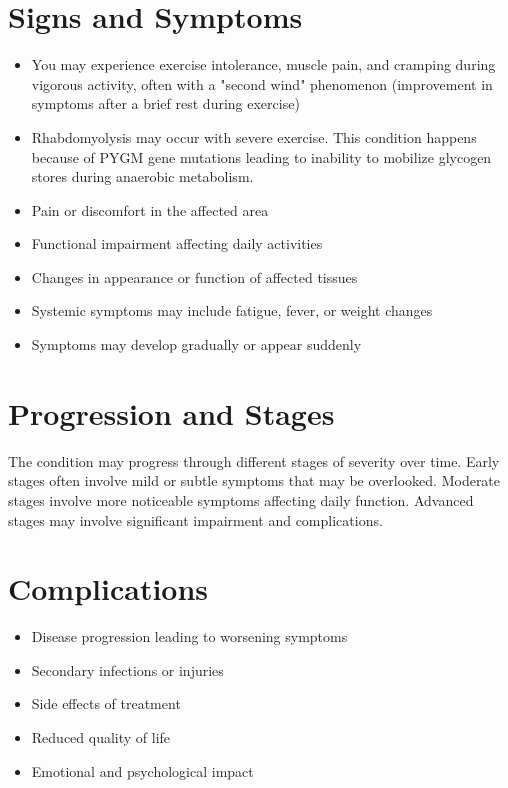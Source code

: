 \section{Signs and Symptoms}
\begin{itemize}[noitemsep]
  \item You may experience exercise intolerance, muscle pain, and cramping during vigorous activity, often with a "second wind" phenomenon (improvement in symptoms after a brief rest during exercise)
  \item Rhabdomyolysis may occur with severe exercise. This condition happens because of PYGM gene mutations leading to inability to mobilize glycogen stores during anaerobic metabolism.
  \item Pain or discomfort in the affected area
  \item Functional impairment affecting daily activities
  \item Changes in appearance or function of affected tissues
  \item Systemic symptoms may include fatigue, fever, or weight changes
  \item Symptoms may develop gradually or appear suddenly
\end{itemize}
\section{Progression and Stages}
The condition may progress through different stages of severity over time. Early stages often involve mild or subtle symptoms that may be overlooked. Moderate stages involve more noticeable symptoms affecting daily function. Advanced stages may involve significant impairment and complications.
\section{Complications}
\begin{itemize}[noitemsep]
  \item Disease progression leading to worsening symptoms
  \item Secondary infections or injuries
  \item Side effects of treatment
  \item Reduced quality of life
  \item Emotional and psychological impact
\end{itemize}
